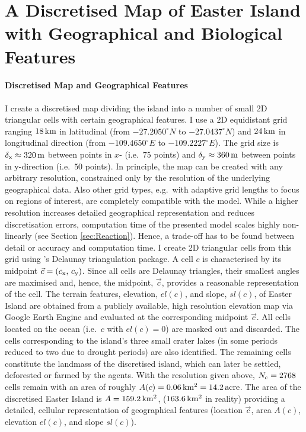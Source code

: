 \section{A Discretised Map of Easter Island with Geographical and Biological Features}\label{sec:CreateMap}
\paragraph{Discretised Map and Geographical Features}
I create a discretised map dividing the island into a number of small 2D triangular cells with certain geographical features.
I use a 2D equidistant grid ranging $18\, {\rm km}$ in latitudinal (from $-27.2050^\circ N$ to $-27.0437^\circ N$) and $24\, {\rm km}$ in longitudinal direction (from  $-109.4650^\circ E$ to 
 $-109.2227^\circ E$).
The grid size is  $\delta_{\rm x} \approx 320\, {\rm m}$ between points in $x$- (i.e.\ $75$ points) and $\delta_{\rm y} \approx 360\, {\rm m}$ between points in y-direction (i.e.\ $50$ points). 
In principle, the map can be created with any arbitrary resolution, constrained only by the resolution of the underlying geographical data. 
Also other grid types, e.g.\ with adaptive grid lengths to focus on regions of interest, are completely compatible with the model. 
While a higher resolution increases detailed geographical representation and reduces discretisation errors, computation time of the presented model scales highly non-linearly (see Section \ref{sec:Reaction}).
Hence, a trade-off has to be found between detail or accuracy and computation time.
I create 2D triangular cells from this grid using \citet{matplotlib}'s Delaunay triangulation package.
A cell $c$ is characterised by its midpoint $\vec{c} = (c_{\rm x},\, c_{\rm y})$. 
Since all cells are Delaunay triangles, their smallest angles are maximised and, hence, the midpoint, $\vec{c}$, provides a reasonable representation of the cell.
The terrain features, elevation, $el(c)$, and slope, $sl(c)$, of Easter Island are obtained from a publicly available, high resolution elevation map \citep{Jarvis2008CIGAR} via Google Earth Engine \citep{gorelick2017google} and evaluated at the corresponding midpoint $\vec{c}$.
All cells located on the ocean (i.e.\ $c$ with $el(c)=0$) are masked out and discarded.
The cells corresponding to the island's three small crater lakes (in some periods reduced to two due to drought periods) are also identified.
The remaining cells constitute the landmass of the discretised island, which can later be settled, deforested or farmed by the agents. 
With the resolution given above, $N_{\rm c} = 2768$ cells remain with an area of roughly $A(c)= 0.06 \, {\rm km^2} = 14.2 \, {\rm acre}$.
The area of the discretised Easter Island is $A=159.2\, {\rm km^2}$, ($163.6\, {\rm km^2}$ in reality) providing a detailed, cellular representation of geographical features (location $\vec{c}$, area $A(c)$, elevation $el(c)$, and slope $sl(c)$).

